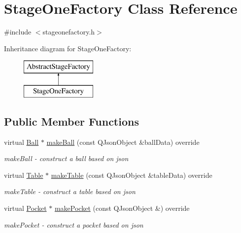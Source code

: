 \hypertarget{class_stage_one_factory}{}\section{Stage\+One\+Factory Class Reference}
\label{class_stage_one_factory}


{\ttfamily \#include $<$stageonefactory.\+h$>$}

Inheritance diagram for Stage\+One\+Factory\+:\begin{figure}[H]
\begin{center}
\leavevmode
\includegraphics[height=2.000000cm]{class_stage_one_factory}
\end{center}
\end{figure}
\subsection*{Public Member Functions}
\begin{DoxyCompactItemize}
\item 
virtual \mbox{\hyperlink{class_ball}{Ball}} $\ast$ \mbox{\hyperlink{class_stage_one_factory_a8a89031bc805b70d93e942275777394d}{make\+Ball}} (const Q\+Json\+Object \&ball\+Data) override
\begin{DoxyCompactList}\small\item\em make\+Ball -\/ construct a ball based on json \end{DoxyCompactList}\item 
virtual \mbox{\hyperlink{class_table}{Table}} $\ast$ \mbox{\hyperlink{class_stage_one_factory_a31e02c98e5c428f0e1ac0a36e641310d}{make\+Table}} (const Q\+Json\+Object \&table\+Data) override
\begin{DoxyCompactList}\small\item\em make\+Table -\/ construct a table based on json \end{DoxyCompactList}\item 
virtual \mbox{\hyperlink{class_pocket}{Pocket}} $\ast$ \mbox{\hyperlink{class_stage_one_factory_ab9d7b7d74b61a2fd6c96562a67dc2fe8}{make\+Pocket}} (const Q\+Json\+Object \&) override
\begin{DoxyCompactList}\small\item\em make\+Pocket -\/ construct a pocket based on json \end{DoxyCompactList}\end{DoxyCompactItemize}


